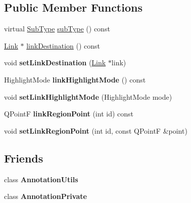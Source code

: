 \subsection*{Public Member Functions}
\begin{DoxyCompactItemize}
\item 
virtual \hyperlink{class_poppler_1_1_annotation_a2d592999c330949d64679cfa9e81113f}{Sub\+Type} \hyperlink{class_poppler_1_1_link_annotation_a05dbb8a3128989c44214ab9e3a1335dd}{sub\+Type} () const
\item 
\hyperlink{class_poppler_1_1_link}{Link} $\ast$ \hyperlink{class_poppler_1_1_link_annotation_a747e4bd67e218223cd66b0128c494194}{link\+Destination} () const
\item 
\mbox{\label{class_poppler_1_1_link_annotation_aa436694a5a841a407e8101b8857f5323}} 
void {\bfseries set\+Link\+Destination} (\hyperlink{class_poppler_1_1_link}{Link} $\ast$link)
\item 
\mbox{\label{class_poppler_1_1_link_annotation_aa803b568f737ebb6962931e4896e2a5f}} 
Highlight\+Mode {\bfseries link\+Highlight\+Mode} () const
\item 
\mbox{\label{class_poppler_1_1_link_annotation_a337beeb9e697151e77a769a7373d69ce}} 
void {\bfseries set\+Link\+Highlight\+Mode} (Highlight\+Mode mode)
\item 
\mbox{\label{class_poppler_1_1_link_annotation_a1c57cd412054a1a53688f23bd916cdfe}} 
Q\+PointF {\bfseries link\+Region\+Point} (int id) const
\item 
\mbox{\label{class_poppler_1_1_link_annotation_a710979bd61d67cfa99612d3b3a963bba}} 
void {\bfseries set\+Link\+Region\+Point} (int id, const Q\+PointF \&point)
\end{DoxyCompactItemize}
\subsection*{Friends}
\begin{DoxyCompactItemize}
\item 
\mbox{\label{class_poppler_1_1_link_annotation_a13daac1cbc1823e18498579fc26b344f}} 
class {\bfseries Annotation\+Utils}
\item 
\mbox{\label{class_poppler_1_1_link_annotation_add0bc3e32e560f9e9eb3025587c1ad54}} 
class {\bfseries Annotation\+Private}
\end{DoxyCompactItemize}


